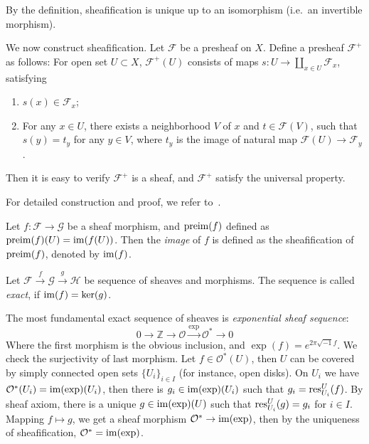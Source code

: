 By the definition, sheafification is unique up to an isomorphism (i.e.\ an invertible morphism).
\begin{cons}
    We now construct sheafification.
    Let $\mathcal{F}$ be a presheaf on $X$.
    Define a presheaf $\mathcal{F}^+$ as follows:
    For open set $U\subset X$, $\mathcal{F}^+(U)$ consists of maps $s:U\to\coprod_{x\in U}\mathcal{F}_x$,
    satisfying
    \begin{enumerate}[(1)]
        \item $s(x)\in\mathcal{F}_x$;
        \item For any $x\in U$, there exists a neighborhood $V$ of $x$ and $t\in\mathcal{F}(V)$, such that $s(y)=t_y$ for any $y\in V$, where $t_y$ is the image of natural map $\mathcal{F}(U)\to\mathcal{F}_y$. 
    \end{enumerate}
    Then it is easy to verify $\mathcal{F}^+$ is a sheaf, and $\mathcal{F}^+$ satisfy the universal property.
\end{cons}
For detailed construction and proof, we refer to~\cite[Section 6.17]{stacks-project}.

\begin{defn}
    Let $f:\mathcal{F}\to\mathcal{G}$ be a sheaf morphism, and $\operatorname{preim}(f)$ defined as $\operatorname{preim}(f)(U)=\operatorname{im}(f(U))$.
    Then the \emph{image} of $f$ is defined as the sheafification of $\operatorname{preim}(f)$, denoted by $\operatorname{im}(f)$.
\end{defn}

\begin{defn}
    Let $\mathcal{F}\xrightarrow{f}\mathcal{G}\xrightarrow{g}\mathcal{H}$ be sequence of sheaves and morphisms.
    The sequence is called \emph{exact}, if $\operatorname{im}(f)=\ker(g)$.
\end{defn}

\begin{eg}
    The most fundamental exact sequence of sheaves is \emph{exponential sheaf sequence}:
    \[0\to\mathbb{Z}\to\mathcal{O}\xrightarrow{\exp}\mathcal{O}^*\to 0\]
    Where the first morphism is the obvious inclusion, and $\exp(f)=e^{2\pi\sqrt{-1}f}$.
    We check the surjectivity of last morphism.
    Let $f\in\mathcal{O}^*(U)$, then $U$ can be covered by simply connected open sets $\{U_i\}_{i\in I}$ (for instance, open disks).
    On $U_i$ we have $\mathcal{O}^*(U_i)=\operatorname{im}(\exp)(U_i)$, then there is $g_i\in\operatorname{im}(\exp)(U_i)$ such that $g_i=\operatorname{res}^U_{U_i}(f)$.
    By sheaf axiom, there is a unique $g\in\operatorname{im}(\exp)(U)$ such that $\operatorname{res}^U_{U_i}(g)=g_i$ for $i\in I$.
    Mapping $f\mapsto g$, we get a sheaf morphism $\mathcal{O}^*\to\operatorname{im}(\exp)$, then by the uniqueness of sheafification, $\mathcal{O}^*=\operatorname{im}(\exp)$.
\end{eg}

